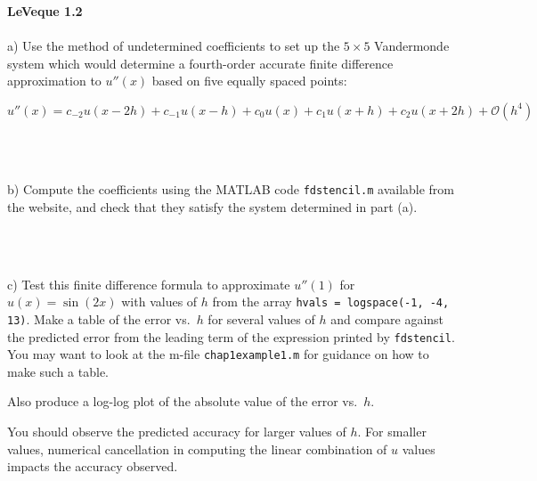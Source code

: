 \textbf{LeVeque 1.2} \\\\
a)  Use the method of undetermined coefficients to set up the $5\times5$ Vandermonde system which would determine a 
  fourth-order accurate finite difference approximation to $u''(x)$ based on five equally spaced points:

  $$
    u''(x) = c_{-2}u(x-2h) + c_{-1}u(x-h) + c_0u(x) + c_1u(x+h) + c_2u(x+2h) + \mathcal{O}(h^4)
  $$


\begin{solution}\ \\\\
\end{solution}


b)  Compute the coefficients using the MATLAB code \texttt{fdstencil.m} available from the website, and check that they
  satisfy the system determined in part (a).

\begin{solution}\ \\\\
\end{solution}

c)  Test this finite difference formula to approximate $u''(1)$ for $u(x) = \sin(2x)$ with values of $h$ from the array 
  \texttt{hvals = logspace(-1, -4, 13)}. Make a table of the error vs.\ $h$ for several values of $h$ and compare 
  against the predicted error from the leading term of the expression printed by \texttt{fdstencil}. You may want to 
  look at the m-file \texttt{chap1example1.m} for guidance on how to make such a table.

  Also produce a log-log plot of the absolute value of the error vs.~$h$.  

  You should observe the predicted accuracy for larger values of $h$. For smaller values, numerical cancellation in 
  computing the linear combination of $u$ values impacts the accuracy observed.
    
\begin{solution}\ \\\\
\end{solution}